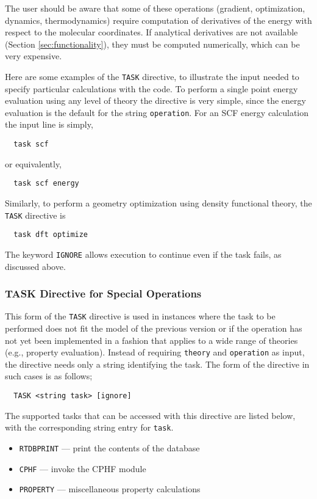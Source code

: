 The user should be aware that some of these operations (gradient,
optimization, dynamics, thermodynamics) require computation of
derivatives of the energy with respect to the molecular coordinates.
If analytical derivatives are not available (Section
\ref{sec:functionality}), they must be computed numerically, which can
be very expensive.

Here are some examples of the \verb+TASK+ directive, to illustrate the
input needed to specify particular calculations with the code.  To
perform a single point energy evaluation using any level of theory the
directive is very simple, since the energy evaluation is the default
for the string \verb+operation+.  For an SCF energy calculation the
input line is simply,
\begin{verbatim}
  task scf
\end{verbatim}
or equivalently,
\begin{verbatim}
  task scf energy
\end{verbatim}

Similarly, to perform a geometry optimization using density functional
theory, the \verb+TASK+ directive is
\begin{verbatim}
  task dft optimize
\end{verbatim}

The keyword \verb+IGNORE+ allows execution to continue even if the
task fails, as discussed above.

\subsubsection{TASK Directive for Special Operations}

This form of the \verb+TASK+ directive is used in instances where the
task to be performed does not fit the model of the previous version or
if the operation has not yet been implemented in a fashion that
applies to a wide range of theories (e.g., property evaluation).
Instead of requiring \verb+theory+ and \verb+operation+ as input, the
directive needs only a string identifying the task.  The form of the
directive in such cases is as follows;

\begin{verbatim}
  TASK <string task> [ignore]
\end{verbatim}

The supported tasks that can be accessed with this directive are listed
below, with the corresponding string entry for \verb+task+.

\begin{itemize}
  \item \verb+RTDBPRINT+ --- print the contents of the database
  \item \verb+CPHF+ --- invoke the CPHF module
  \item \verb+PROPERTY+ --- miscellaneous property calculations
\end{itemize}

